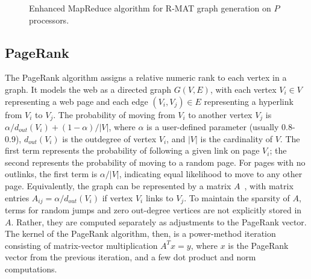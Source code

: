 \begin{figure}[htb]
 \begin{center}\end{center}

 \caption{Enhanced MapReduce algorithm for R-MAT graph generation on $P$ processors.}

 \label{fig:rmat2}
\end{figure}

\subsection{PageRank}
\label{subsec:graph_pagerank}

The PageRank algorithm assigns a relative numeric rank to each
vertex in a graph.
It models the web as a directed graph $G(V,E)$, with each vertex $V_i
\in V$ representing a web page and each edge $(V_i, V_j) \in E$
representing a hyperlink from $V_i$ to $V_j$.  The probability of
moving from $V_i$ to another vertex $V_j$ is $\alpha/d_{out}(V_i) +
(1-\alpha)/|V|$, where $\alpha$ is a user-defined parameter (usually
0.8-0.9), $d_{out}(V_i)$ is the outdegree of vertex $V_i$, and $|V|$ is
the cardinality of $V$.  The first term represents the probability of
following a given link on page $V_i$; the second represents the
probability of moving to a random page.  For pages with no outlinks,
the first term is $\alpha/|V|$, indicating equal likelihood to move to
any other page.  Equivalently, the graph can be represented by a
matrix $A$~\cite{LangvilleMeyer05a}, with matrix entries $A_{ij} =
\alpha/d_{out}(V_i)$ if vertex $V_i$ links to $V_j$.  To maintain the 
sparsity of $A$, terms for random jumps and zero out-degree vertices are
not explicitly stored in $A$.  Rather, they are computed separately
as adjustments to the PageRank vector.  The kernel of the PageRank
algorithm, then, is a power-method iteration consisting of 
matrix-vector multiplication $A^T x=y$,
where $x$ is the PageRank vector from the previous iteration, and
a few dot product and norm computations.

